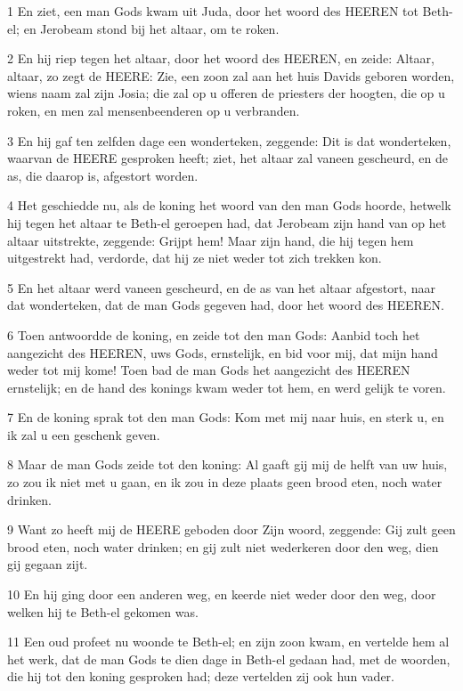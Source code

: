 \par 1 En ziet, een man Gods kwam uit Juda, door het woord des HEEREN tot Beth-el; en Jerobeam stond bij het altaar, om te roken.
\par 2 En hij riep tegen het altaar, door het woord des HEEREN, en zeide: Altaar, altaar, zo zegt de HEERE: Zie, een zoon zal aan het huis Davids geboren worden, wiens naam zal zijn Josia; die zal op u offeren de priesters der hoogten, die op u roken, en men zal mensenbeenderen op u verbranden.
\par 3 En hij gaf ten zelfden dage een wonderteken, zeggende: Dit is dat wonderteken, waarvan de HEERE gesproken heeft; ziet, het altaar zal vaneen gescheurd, en de as, die daarop is, afgestort worden.
\par 4 Het geschiedde nu, als de koning het woord van den man Gods hoorde, hetwelk hij tegen het altaar te Beth-el geroepen had, dat Jerobeam zijn hand van op het altaar uitstrekte, zeggende: Grijpt hem! Maar zijn hand, die hij tegen hem uitgestrekt had, verdorde, dat hij ze niet weder tot zich trekken kon.
\par 5 En het altaar werd vaneen gescheurd, en de as van het altaar afgestort, naar dat wonderteken, dat de man Gods gegeven had, door het woord des HEEREN.
\par 6 Toen antwoordde de koning, en zeide tot den man Gods: Aanbid toch het aangezicht des HEEREN, uws Gods, ernstelijk, en bid voor mij, dat mijn hand weder tot mij kome! Toen bad de man Gods het aangezicht des HEEREN ernstelijk; en de hand des konings kwam weder tot hem, en werd gelijk te voren.
\par 7 En de koning sprak tot den man Gods: Kom met mij naar huis, en sterk u, en ik zal u een geschenk geven.
\par 8 Maar de man Gods zeide tot den koning: Al gaaft gij mij de helft van uw huis, zo zou ik niet met u gaan, en ik zou in deze plaats geen brood eten, noch water drinken.
\par 9 Want zo heeft mij de HEERE geboden door Zijn woord, zeggende: Gij zult geen brood eten, noch water drinken; en gij zult niet wederkeren door den weg, dien gij gegaan zijt.
\par 10 En hij ging door een anderen weg, en keerde niet weder door den weg, door welken hij te Beth-el gekomen was.
\par 11 Een oud profeet nu woonde te Beth-el; en zijn zoon kwam, en vertelde hem al het werk, dat de man Gods te dien dage in Beth-el gedaan had, met de woorden, die hij tot den koning gesproken had; deze vertelden zij ook hun vader.
